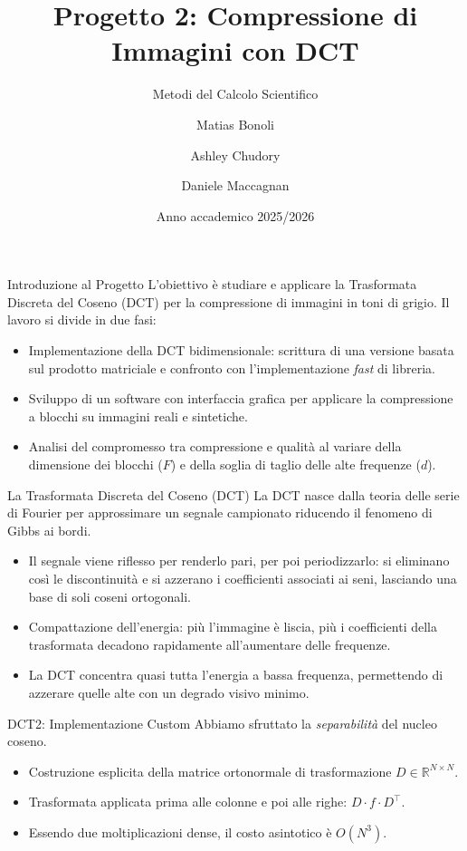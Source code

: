 \documentclass[11pt,aspectratio=169,xcolor=dvipsnames]{beamer}
\title{Progetto 2: Compressione di Immagini con DCT}
\subtitle{Metodi del Calcolo Scientifico}
\author{Matias Bonoli \and Ashley Chudory \and Daniele Maccagnan}
\date{Anno accademico 2025/2026}
\begin{document}
\begin{frame}[plain]
    \titlepage
\end{frame}

\begin{frame}{Introduzione al Progetto}
    L'obiettivo è studiare e applicare la Trasformata Discreta del Coseno (DCT) per la compressione di immagini in toni di grigio. Il lavoro si divide in due fasi:
    \begin{itemize}
        \item Implementazione della DCT bidimensionale: scrittura di una versione basata sul prodotto matriciale e confronto con l'implementazione \emph{fast} di libreria.
        \item Sviluppo di un software con interfaccia grafica per applicare la compressione a blocchi su immagini reali e sintetiche.
        \item Analisi del compromesso tra compressione e qualità al variare della dimensione dei blocchi ($F$) e della soglia di taglio delle alte frequenze ($d$).
    \end{itemize}
\end{frame}

\begin{frame}{La Trasformata Discreta del Coseno (DCT)}
    La DCT nasce dalla teoria delle serie di Fourier per approssimare un segnale campionato riducendo il fenomeno di Gibbs ai bordi.
    \begin{itemize}
        \item Il segnale viene riflesso per renderlo pari, per poi periodizzarlo: si eliminano così le discontinuità e si azzerano i coefficienti associati ai seni, lasciando una base di soli coseni ortogonali.
        \item Compattazione dell'energia: più l'immagine è liscia, più i coefficienti della trasformata decadono rapidamente all'aumentare delle frequenze.
        \item La DCT concentra quasi tutta l'energia a bassa frequenza, permettendo di azzerare quelle alte con un degrado visivo minimo.
    \end{itemize}
\end{frame}

\begin{frame}{DCT2: Implementazione Custom}
    Abbiamo sfruttato la \emph{separabilità} del nucleo coseno.
    \begin{itemize}
        \item Costruzione esplicita della matrice ortonormale di trasformazione $D \in \mathbb{R}^{N \times N}$.
        \item Trasformata applicata prima alle colonne e poi alle righe: $D \cdot f \cdot D^\top$.
        \item Essendo due moltiplicazioni dense, il costo asintotico è $O(N^3)$.
    \end{itemize}
\end{frame}
\end{document}
